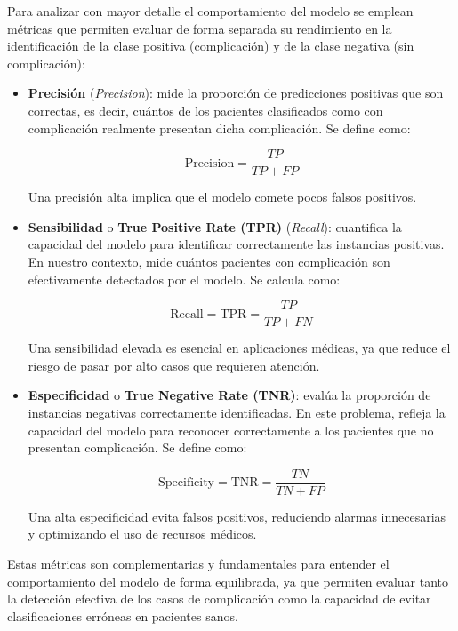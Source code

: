 Para analizar con mayor detalle el comportamiento del modelo se emplean métricas que permiten evaluar de forma separada su rendimiento en la identificación de la clase positiva (complicación) y de la clase negativa (sin complicación):

\begin{itemize}
    \item \textbf{Precisión} (\textit{Precision}): mide la proporción de predicciones positivas que son correctas, es decir, cuántos de los pacientes clasificados como con complicación realmente presentan dicha complicación. Se define como:

    \[
    \text{Precision} = \frac{TP}{TP + FP}
    \]

    Una precisión alta implica que el modelo comete pocos falsos positivos.

    \item \textbf{Sensibilidad} o \textbf{True Positive Rate (TPR)} (\textit{Recall}): cuantifica la capacidad del modelo para identificar correctamente las instancias positivas. En nuestro contexto, mide cuántos pacientes con complicación son efectivamente detectados por el modelo. Se calcula como:

    \[
    \text{Recall} = \text{TPR} = \frac{TP}{TP + FN}
    \]

    Una sensibilidad elevada es esencial en aplicaciones médicas, ya que reduce el riesgo de pasar por alto casos que requieren atención.

    \item \textbf{Especificidad} o \textbf{True Negative Rate (TNR)}: evalúa la proporción de instancias negativas correctamente identificadas. En este problema, refleja la capacidad del modelo para reconocer correctamente a los pacientes que no presentan complicación. Se define como:

    \[
    \text{Specificity} = \text{TNR} = \frac{TN}{TN + FP}
    \]

    Una alta especificidad evita falsos positivos, reduciendo alarmas innecesarias y optimizando el uso de recursos médicos.
\end{itemize}

Estas métricas son complementarias y fundamentales para entender el comportamiento del modelo de forma equilibrada, ya que permiten evaluar tanto la detección efectiva de los casos de complicación como la capacidad de evitar clasificaciones erróneas en pacientes sanos.

